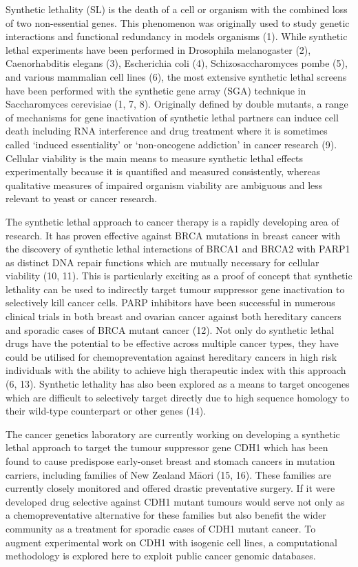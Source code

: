 Synthetic lethality (SL) is the death of a cell or organism with the combined loss of two non-essential genes. This phenomenon was originally used to study genetic interactions and functional redundancy in models organisms (1). While synthetic lethal experiments have been performed in Drosophila melanogaster (2), Caenorhabditis elegans (3), Escherichia coli (4), Schizosaccharomyces pombe (5), and various mammalian cell lines (6), the most extensive synthetic lethal screens have been performed with the synthetic gene array (SGA) technique in Saccharomyces cerevisiae (1, 7, 8). Originally defined by double mutants, a range of mechanisms for gene inactivation of synthetic lethal partners can induce cell death including RNA interference and drug treatment where it is sometimes called ‘induced essentiality’ or ‘non-oncogene addiction’ in cancer research (9). Cellular viability is the main means to measure synthetic lethal effects experimentally because it is quantified and measured consistently, whereas qualitative measures of impaired organism viability are ambiguous and less relevant to yeast or cancer research.

The synthetic lethal approach to cancer therapy is a rapidly developing area of research. It has proven effective against BRCA mutations in breast cancer with the discovery of synthetic lethal interactions of BRCA1 and BRCA2 with PARP1 as distinct DNA repair functions which are mutually necessary for cellular viability (10, 11). This is particularly exciting as a proof of concept that synthetic lethality can be used to indirectly target tumour suppressor gene inactivation to selectively kill cancer cells. PARP inhibitors have been successful in numerous clinical trials in both breast and ovarian cancer against both hereditary cancers and sporadic cases of BRCA mutant cancer (12). Not only do synthetic lethal drugs have the potential to be effective across multiple cancer types, they have could be utilised for chemopreventation against hereditary cancers in high risk individuals with the ability to achieve high therapeutic index with this approach (6, 13). Synthetic lethality has also been explored as a means to target oncogenes which are difficult to selectively target directly due to high sequence homology to their wild-type counterpart or other genes (14).

The cancer genetics laboratory are currently working on developing a synthetic lethal approach to target the tumour suppressor gene CDH1 which has been found to cause predispose early-onset breast and stomach cancers in mutation carriers, including families of New Zealand M\={a}ori (15, 16). These families are currently closely monitored and offered drastic preventative surgery. If it were developed drug selective against CDH1 mutant tumours would serve not only as a chemopreventative alternative for these families but also benefit the wider community as a treatment for sporadic cases of CDH1 mutant cancer. To augment experimental work on CDH1 with isogenic cell lines, a computational methodology is explored here to exploit public cancer genomic databases.


